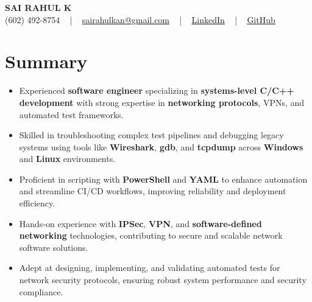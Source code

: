 \documentclass[letterpaper,11pt]{article}
\newcommand{\resumeItem}[1]{
  \item\footnotesize{
    {#1 \vspace{-2pt}}
  }
}
\newcommand{\resumeItemListStart}{\begin{itemize}[leftmargin=*]}
\newcommand{\resumeItemListEnd}{\end{itemize}\vspace{-5pt}}
\begin{document}
\begin{center}
    {\fontsize{14pt}{12pt}\selectfont \textbf{\MakeUppercase{Sai Rahul K}}}\\ \vspace{2pt}
    \fontsize{10pt}{12pt}\selectfont (602) 492-8754 ~ | ~ \href{mailto:sairahulkan@gmail.com}{sairahulkan@gmail.com} ~ | ~
    \href{https://www.linkedin.com/in/rq123/}{\color{blue}\underline{LinkedIn}} ~ | ~
    \href{https://github.com/kanrahuldo}{\color{blue}\underline{GitHub}}~
    \vspace{-8pt}
\end{center}

\section{Summary}
\fontsize{9pt}{10pt}\selectfont
\resumeItemListStart
    \resumeItem{Experienced \textbf{software engineer} specializing in \textbf{systems-level C/C++ development} with strong expertise in \textbf{networking protocols}, VPNs, and automated test frameworks.}
    \resumeItem{Skilled in troubleshooting complex test pipelines and debugging legacy systems using tools like \textbf{Wireshark}, \textbf{gdb}, and \textbf{tcpdump} across \textbf{Windows} and \textbf{Linux} environments.}
    \resumeItem{Proficient in scripting with \textbf{PowerShell} and \textbf{YAML} to enhance automation and streamline CI/CD workflows, improving reliability and deployment efficiency.}
    \resumeItem{Hands-on experience with \textbf{IPSec}, \textbf{VPN}, and \textbf{software-defined networking} technologies, contributing to secure and scalable network software solutions.}
    \resumeItem{Adept at designing, implementing, and validating automated tests for network security protocols, ensuring robust system performance and security compliance.}
\resumeItemListEnd
\vspace{-6pt}
\end{document}
